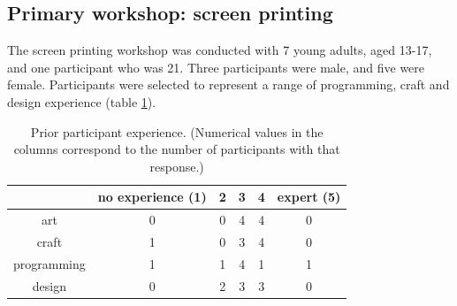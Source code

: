 \documentclass{sigchi}
\newcommand\tabhead[1]{\small\textbf{#1}}
\begin{document}
\subsection{Primary workshop: screen printing}
The screen printing workshop was conducted with 7 young adults, aged 13-17, and one participant who was 21. Three participants were male, and five were female. Participants were selected to represent a range of programming, craft and design experience (table \ref{table:experience}).
\begin{table}
 \centering
 \begin{tabular}{|c|c|c|c|c|c|}
 \hline
 \multicolumn{1}{|p{0.75cm}|}{\centering\tabhead{}} &
 \multicolumn{1}{|p{1.3cm}|}{\centering\small{no experience (1)}} &
 \multicolumn{1}{|p{0.75cm}|}{\centering\small{2}}&
 \multicolumn{1}{|p{0.75cm}|}{\centering\small{3}}&
 \multicolumn{1}{|p{0.75cm}|}{\centering\small{4}}&
 \multicolumn{1}{|p{0.75cm}|}{\centering\small{expert (5)}}\\
 \hline
 \small{art} & 0 & 0 & 4 & 4 & 0\\
 \hline
 \small{craft} & 1 & 0 & 3 & 4& 0 \\
 \hline
 \small{programming} & 1 & 1 & 4 & 1& 1 \\
 \hline
 \small{design} & 0 & 2 & 3 & 3& 0 \\
 \hline
 \end{tabular}
 \caption{Prior participant experience. (Numerical values in the columns correspond to the number of participants with that response.)}
\label{table:experience}
\end{table}
\end{document}
